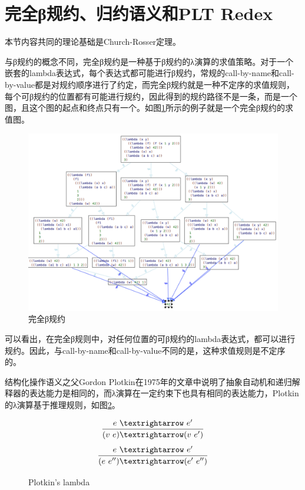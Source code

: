 \section{完全β规约、归约语义和PLT Redex}

本节内容共同的理论基础是Church-Rosser定理\cite{churchrosser}。

与β规约的概念不同，完全β规约是一种基于β规约的λ演算的求值策略。对于一个嵌套的lambda表达式，每个表达式都可能进行β规约，常规的call-by-name和call-by-value都是对规约顺序进行了约定，而完全β规约就是一种不定序的求值规则，每个可β规约的位置都有可能进行规约，因此得到的规约路径不是一条，而是一个图，且这个图的起点和终点只有一个。如图\ref{fig:beta}所示的例子就是一个完全β规约的求值图。

\begin{figure}[ht]
	\centering
	\includegraphics[width=12cm]{images/chapter2/fullbeta.png}
	\caption{完全β规约}
	\label{fig:beta}
\end{figure}

可以看出，在完全β规则中，对任何位置的可β规约的lambda表达式，都可以进行规约。因此，与call-by-name和call-by-value不同的是，这种求值规则是不定序的。

结构化操作语义\cite{structural}之父Gordon Plotkin在1975年的文章中说明了抽象自动机和递归解释器的表达能力是相同的，而λ演算在一定约束下也具有相同的表达能力，Plotkin的λ演算基于推理规则，如图\ref{fig:plotkin}。

\begin{figure}[ht]
	\centering
	\[\infer {(v~e) → (v~e')}{e~→~e'}  \]
	\[\infer {(e~e'') → (e'~e'')} {e~→~e'}  \]
	\caption{Plotkin's lambda}
	\label{fig:plotkin}
\end{figure} 

	

